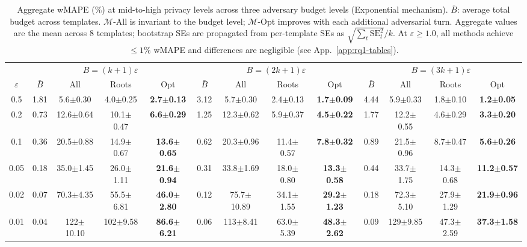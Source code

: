 \providecommand{\pmstd}[1]{{\scriptsize $\pm$#1}}

\begin{table}[t]
\centering
\setlength{\tabcolsep}{2.8pt}
\small
\caption{Aggregate wMAPE (\%) at mid-to-high privacy levels across three adversary budget levels (Exponential mechanism). $\bar{B}$: average total budget across templates. $\mathcal{M}$-All is invariant to the budget level; $\mathcal{M}$-Opt improves with each additional adversarial turn. Aggregate values are the mean across 8 templates; bootstrap SEs are propagated from per-template SEs as $\sqrt{\sum_t \mathrm{SE}_t^2}/k$. At $\varepsilon \geq 1.0$, all methods achieve $\leq 1\%$ wMAPE and differences are negligible (see App.~\ref{app:rq1-tables}).}
\label{tab:double_asymmetry}
\begin{tabular}{c|cccc|cccc|cccc}
\toprule
& \multicolumn{4}{c|}{$B = (k{+}1)\varepsilon$} & \multicolumn{4}{c|}{$B = (2k{+}1)\varepsilon$} & \multicolumn{4}{c}{$B = (3k{+}1)\varepsilon$} \\
$\varepsilon$ & $\bar{B}$ & All & Roots & Opt & $\bar{B}$ & All & Roots & Opt & $\bar{B}$ & All & Roots & Opt \\
\midrule
0.5 & 1.81 & 5.6\pmstd{0.30} & 4.0\pmstd{0.25} & \textbf{2.7\pmstd{0.13}} & 3.12 & 5.7\pmstd{0.30} & 2.4\pmstd{0.13} & \textbf{1.7\pmstd{0.09}} & 4.44 & 5.9\pmstd{0.33} & 1.8\pmstd{0.10} & \textbf{1.2\pmstd{0.05}} \\
0.2 & 0.73 & 12.6\pmstd{0.64} & 10.1\pmstd{0.47} & \textbf{6.6\pmstd{0.29}} & 1.25 & 12.3\pmstd{0.62} & 5.9\pmstd{0.37} & \textbf{4.5\pmstd{0.22}} & 1.77 & 12.2\pmstd{0.55} & 4.6\pmstd{0.29} & \textbf{3.3\pmstd{0.20}} \\
0.1 & 0.36 & 20.5\pmstd{0.88} & 14.9\pmstd{0.67} & \textbf{13.6\pmstd{0.65}} & 0.62 & 20.3\pmstd{0.96} & 11.4\pmstd{0.57} & \textbf{7.8\pmstd{0.32}} & 0.89 & 21.5\pmstd{0.96} & 8.7\pmstd{0.47} & \textbf{5.6\pmstd{0.26}} \\
0.05 & 0.18 & 35.0\pmstd{1.45} & 26.0\pmstd{1.11} & \textbf{21.6\pmstd{0.94}} & 0.31 & 33.8\pmstd{1.69} & 18.0\pmstd{0.80} & \textbf{13.3\pmstd{0.58}} & 0.44 & 33.7\pmstd{1.75} & 14.3\pmstd{0.68} & \textbf{11.2\pmstd{0.57}} \\
0.02 & 0.07 & 70.3\pmstd{4.35} & 55.5\pmstd{6.81} & \textbf{46.0\pmstd{2.80}} & 0.12 & 75.7\pmstd{10.89} & 34.1\pmstd{1.55} & \textbf{29.2\pmstd{1.23}} & 0.18 & 72.3\pmstd{5.10} & 27.9\pmstd{1.29} & \textbf{21.9\pmstd{0.96}} \\
0.01 & 0.04 & 122\pmstd{10.10} & 102\pmstd{9.58} & \textbf{86.6\pmstd{6.21}} & 0.06 & 113\pmstd{8.41} & 63.0\pmstd{5.39} & \textbf{48.3\pmstd{2.62}} & 0.09 & 129\pmstd{9.85} & 47.3\pmstd{2.59} & \textbf{37.3\pmstd{1.58}} \\
\bottomrule
\end{tabular}
\end{table}
